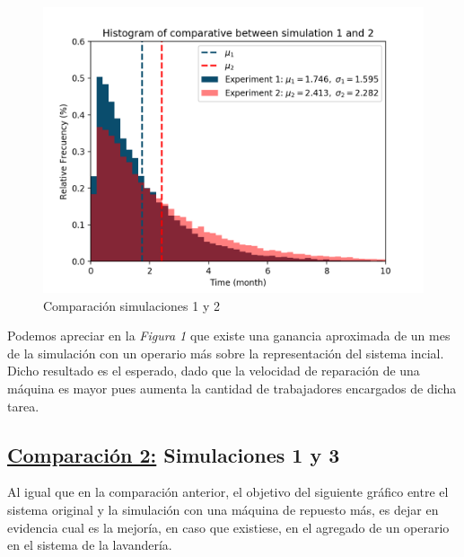     \begin{figure}[H]
      \includegraphics[scale=1.1]{graphics/Comparative_graphic_1.png}
      \caption{Comparación simulaciones 1 y 2}
      \centering
    \end{figure}

    \par Podemos apreciar en la \textit{Figura 1} que existe una ganancia aproximada de un mes de la simulación con un
    operario más sobre la representación del sistema incial. Dicho resultado es el esperado, dado que la velocidad de
    reparación de una máquina es mayor pues aumenta la cantidad de trabajadores encargados de dicha tarea.

  \pagebreak
  \subsection{\underline{Comparación 2:} Simulaciones 1 y 3}

    \par Al igual que en la comparación anterior, el objetivo del siguiente gráfico entre el sistema original y la
    simulación con una máquina de repuesto más, es dejar en evidencia cual es la mejoría, en caso que existiese, en el
    agregado de un operario en el sistema de la lavandería.

